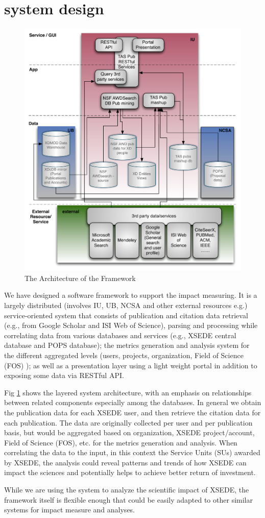\section{system design}

\begin{figure}[htb]
  \centering
    \includegraphics[width=1.0\columnwidth]{images/tas-arch.pdf}
  \caption{The Architecture of the Framework}\label{F:tas-arch}
\end{figure}
 
We have designed a software framework to support the impact measuring. It is a largely distributed (involves IU, UB, NCSA and other external resources e.g.) service-oriented system  that consists of publication and citation data retrieval (e.g., from Google Scholar and ISI Web of Science), parsing and processing while correlating data from various databases and services (e.g., XSEDE central database and POPS database); the metrics generation and analysis system for the different aggregated levels (users, projects, organization, Field of Science (FOS) ); as well as a presentation layer using a light weight portal in addition to exposing some data via RESTful API.

Fig \ref{F:tas-arch} shows the layered system architecture, with an emphasis on relationships between related components especially among the databases. In general we obtain the publication data for each XSEDE user, and then retrieve the citation data for each publication. The data are originally collected per user and per publication basis, but would be aggregated based on organization, XSEDE project/account, Field of Science (FOS), etc. for the metrics generation and analysis. When correlating the data to the input, in this context the Service Units (SUs) awarded by XSEDE, the analysis could reveal patterns and trends of how XSEDE can impact the sciences and potentially helps to achieve better return of investment.

While we are using the system to analyze the scientific impact of XSEDE, the framework itself is flexible enough that could be easily adapted to other similar systems for impact measure and analyses.
